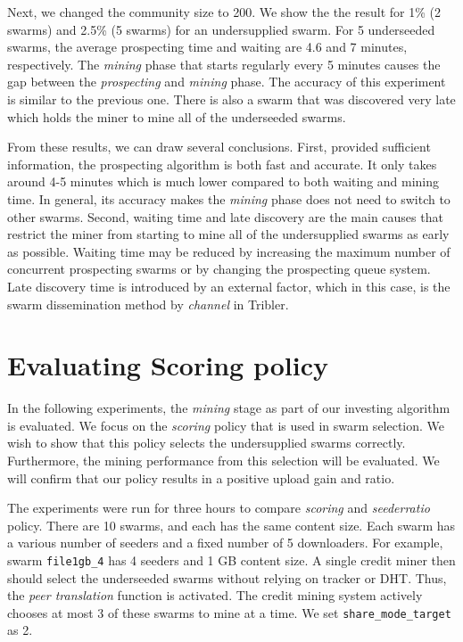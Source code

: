 Next, we changed the community size to 200. We show the the result for 1\% (2 swarms) and 2.5\% (5 swarms) for an undersupplied swarm. For 5 underseeded swarms, the average prospecting time and waiting are 4.6 and 7 minutes, respectively. The \textit{mining} phase that starts regularly every 5 minutes causes the gap between the \textit{prospecting} and \textit{mining} phase. The accuracy of this experiment is similar to the previous one. There is also a swarm that was discovered very late which holds the miner to mine all of the underseeded swarms.

From these results, we can draw several conclusions. First, provided sufficient information, the prospecting algorithm is both fast and accurate. It only takes around 4-5 minutes which is much lower compared to both waiting and mining time. In general, its accuracy makes the \textit{mining} phase does not need to switch to other swarms. Second, waiting time and late discovery are the main causes that restrict the miner from starting to mine all of the undersupplied swarms as early as possible. Waiting time may be reduced by increasing the maximum number of concurrent prospecting swarms or by changing the prospecting queue system. Late discovery time is introduced by an external factor, which in this case, is the swarm dissemination method by \textit{channel} in Tribler. 
\vspace{-0.3cm}
\section{Evaluating Scoring policy}
\label{section:evalscoring}
In the following experiments, the \textit{mining} stage as part of our investing algorithm is evaluated. We focus on the \textit{scoring} policy that is used in swarm selection. We wish to show that this policy selects the undersupplied swarms correctly. Furthermore, the mining performance from this selection will be evaluated. We will confirm that our policy results in a positive upload gain and ratio. 

The experiments were run for three hours to compare \textit{scoring} and \textit{seederratio} policy. There are 10 swarms, and each has the same content size. Each swarm has a various number of seeders and a fixed number of 5 downloaders. For example, swarm \texttt{file1gb\_4} has 4 seeders and 1 GB content size. A single credit miner then should select the underseeded swarms without relying on tracker or DHT. Thus, the \textit{peer translation} function is activated. The credit mining system actively chooses at most 3 of these swarms to mine at a time. We set \texttt{share\_mode\_target} as 2.

